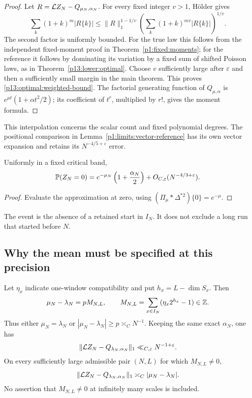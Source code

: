 \begin{proof}
Let \(R=\Law Z_N-Q_{\mu_N,\alpha_N}\).
For every fixed integer \(v>1\), H\"older gives
\[
 \sum_k(1+k)^m|R\{k\}|
 \le\|R\|_1^{1-1/v}
       \left(\sum_k(1+k)^{mv}|R\{k\}|\right)^{1/v}.
\]
The second factor is uniformly bounded.
For the true law this follows from the independent
fixed-moment proof in Theorem~\ref{p1:fixed:moments};
for the reference it follows by dominating its variation
by a fixed sum of shifted Poisson laws, as in
Theorem~\ref{p13:lower:optimal}.
Choose \(v\) sufficiently large after \(\varepsilon\)
and then a sufficiently small margin in the main theorem.
This proves \eqref{p13:optimal:weighted-bound}.
The factorial generating function of \(Q_{\mu,\alpha}\)
is \(e^{\mu t}(1+\alpha t^2/2)\); its coefficient of
\(t^r\), multiplied by \(r!\), gives the moment formula.
\end{proof}

This interpolation concerns the scalar count and fixed
polynomial degrees. The positional comparison in
Lemma~\ref{p1:limits:vector-reference} has its own
vector expansion and retains its
\(N^{-4/5+\varepsilon}\) error.

\begin{corollary}
\label{p13:optimal:zero}
Uniformly in a fixed critical band,
\[
 \P(Z_N=0)
   =e^{-\mu_N}\left(1+\frac{\alpha_N}{2}\right)
          +O_{C,\varepsilon}(N^{-4/3+\varepsilon}).
\]
\end{corollary}

\begin{proof}
Evaluate the approximation at zero, using
\((\Pi_\mu*\Delta^{*2})\{0\}=e^{-\mu}\).
\end{proof}

The event is the absence of a retained start in \(I_N\).
It does not exclude a long run that started before \(N\).

\subsection{Why the mean must be specified at this precision}

\begin{proposition}
\label{p13:optimal:nominal}
Let \(\eta_x\) indicate one-window compatibility and put
\(h_x=L-\dim S_x\). Then
\begin{equation}
 \mu_N-\lambda_N=pM_{N,L},\qquad
 M_{N,L}=\sum_{x\in I_N}(\eta_x2^{h_x}-1)\in\Z.
 \label{p13:optimal:integer-mean}
\end{equation}
Thus either \(\mu_N=\lambda_N\) or
\(|\mu_N-\lambda_N|\ge p\asymp_C N^{-1}\).
Keeping the same exact \(\alpha_N\), one has
\[
 \|\Law Z_N-Q_{\lambda_N,\alpha_N}\|_1
       \ll_{C,\varepsilon}N^{-1+\varepsilon}.
\]
On every sufficiently large admissible pair \((N,L)\)
for which \(M_{N,L}\ne0\),
\begin{equation}
 \|\Law Z_N-Q_{\lambda_N,\alpha_N}\|_1
       \asymp_C|\mu_N-\lambda_N|.
 \label{p13:optimal:nominal-distance}
\end{equation}
No assertion that \(M_{N,L}\ne0\) at infinitely many
scales is included.
\end{proposition}

